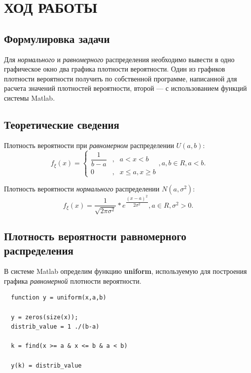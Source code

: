 \section{ХОД РАБОТЫ}

\subsection{Формулировка задачи}

Для \textit{нормального} и \textit{равномерного} распределения необходимо
вывести в одно графическое окно два графика плотности вероятности. Один из графиков
плотности вероятности получить по собственной программе, написанной для расчета
значений плотностей вероятности, второй --- с использованием функций системы Matlab.

\subsection{Теоретические сведения}

Плотность вероятности при \textit{равномерном} распределении $ U(a,b) $:
$$
  f_{\xi}(x) =  \left\{
                \begin{aligned}
                  \dfrac{1}{b-a}&, &a<x<b \\
                  0&,              &x \le a, x \ge b
                \end{aligned}
                \right.
                , a,b \in R, a<b.
$$

Плотность вероятности \textit{нормального} распределении $ N(a, \sigma^2) $:
$$
  f_{\xi}(x) = \dfrac{1}{\sqrt{2\pi\sigma^2}}*e^{\dfrac{(x-a)^2}{2\sigma^2}}, a \in R, \sigma^2 > 0.
$$

\subsection{Плотность вероятности равномерного распределения}

В системе Matlab определим функцию \textbf{uniform}, используемую для построения
графика \textit{равномерной} плотности вероятности.

\begin{lstlisting}
  function y = uniform(x,a,b)

  y = zeros(size(x));
  distrib_value = 1 ./(b-a)

  k = find(x >= a & x <= b & a < b)

  y(k) = distrib_value
\end{lstlisting}

